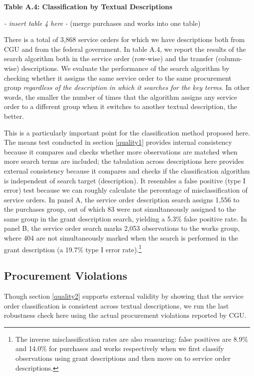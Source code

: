 \documentclass[]{article}
\let\rmarkdownfootnote\footnote%
\def\footnote{\protect\rmarkdownfootnote}
\theoremstyle{definition}
\theoremstyle{definition}
\theoremstyle{definition}
\theoremstyle{remark}
\begin{document}
\textbf{Table A.4: Classification by Textual Descriptions}

\emph{- insert table 4 here -} (merge purchases and works into one
table)

There is a total of 3,868 service orders for which we have descriptions
both from CGU and from the federal government. In table A.4, we report
the results of the search algorithm both in the service order (row-wise)
and the transfer (column-wise) descriptions. We evaluate the performance
of the search algorithm by checking whether it assigns the same service
order to the same procurement group \emph{regardless of the description
in which it searches for the key terms}. In other words, the smaller the
number of times that the algorithm assigns any service order to a
different group when it switches to another textual description, the
better.

This is a particularly important point for the classification method
proposed here. The means test conducted in section \ref{quality1}
provides internal consistency because it compares and checks whether
more observations are matched when more search terms are included; the
tabulation across descriptions here provides external consistency
because it compares and checks if the classification algorithm is
independent of search target (description). It resembles a false
positive (type I error) test because we can roughly calculate the
percentage of misclassification of service orders. In panel A, the
service order description search assigns 1,556 to the purchases group,
out of which 83 were not simultaneously assigned to the same group in
the grant description search, yielding a 5.3\% false positive rate. In
panel B, the service order search marks 2,053 observations to the works
group, where 404 are not simultaneously marked when the search is
performed in the grant description (a 19.7\% type I error
rate).\footnote{The inverse misclassification rates are also reassuring:
  false positives are 8.9\% and 14.0\% for purchases and works
  respectively when we first classify observations using grant
  descriptions and then move on to service order descriptions.}

\hypertarget{quality3}{%
\subsection{Procurement Violations}\label{quality3}}

Though section \ref{quality2} supports external validity by showing that
the service order classification is consistent across textual
descriptions, we run the last robustness check here using the actual
procurement violations reported by CGU.
\end{document}
